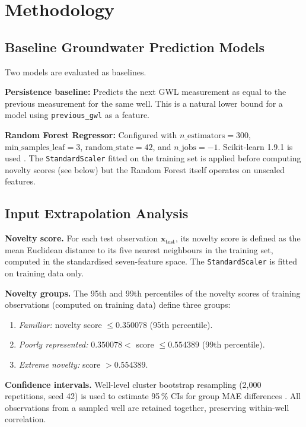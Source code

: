 \documentclass[conference]{IEEEtran}
\begin{document}
\section{Methodology}
\label{sec:method}

\subsection{Baseline Groundwater Prediction Models}

Two models are evaluated as baselines.

\textbf{Persistence baseline:} Predicts the next GWL measurement as equal
to the previous measurement for the same well.
This is a natural lower bound for a model using \texttt{previous\_gwl}
as a feature.

\textbf{Random Forest Regressor:} Configured with
$n\_\text{estimators} = 300$,
$\text{min\_samples\_leaf} = 3$,
$\text{random\_state} = 42$, and
$n\_\text{jobs} = -1$.
Scikit-learn 1.9.1 is used \cite{pedregosa2011scikit}.
The \texttt{StandardScaler} fitted on the training set is applied before
computing novelty scores (see below) but the Random Forest itself
operates on unscaled features.

\subsection{Input Extrapolation Analysis}

\textbf{Novelty score.}
For each test observation $\mathbf{x}_{\text{test}}$, its novelty score
is defined as the mean Euclidean distance to its five nearest neighbours
in the training set, computed in the standardised seven-feature space.
The \texttt{StandardScaler} is fitted on training data only.

\textbf{Novelty groups.}
The 95th and 99th percentiles of the novelty scores of training
observations (computed on training data) define three groups:
\begin{enumerate}
  \item \textit{Familiar:} novelty score $\leq 0.350078$ (95th percentile).
  \item \textit{Poorly represented:} $0.350078 <$ score $\leq 0.554389$ (99th percentile).
  \item \textit{Extreme novelty:} score $> 0.554389$.
\end{enumerate}

\textbf{Confidence intervals.}
Well-level cluster bootstrap resampling (2{,}000 repetitions, seed 42) is
used to estimate 95\,\% CIs for group MAE differences \cite{efron1993bootstrap}.
All observations from a sampled well are retained together, preserving
within-well correlation.
\end{document}

